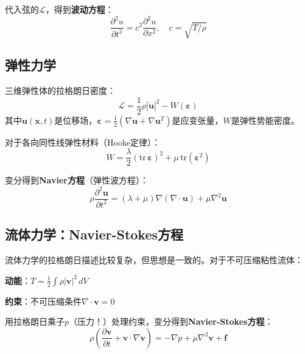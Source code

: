 代入弦的$\mathcal{L}$，得到\textbf{波动方程}：
\begin{equation}
\boxed{\frac{\partial^2 u}{\partial t^2} = c^2 \frac{\partial^2 u}{\partial x^2}, \quad c = \sqrt{T/\rho}}
\end{equation}

\subsection*{弹性力学}

三维弹性体的拉格朗日密度：
\begin{equation}
\mathcal{L} = \frac{1}{2}\rho |\dot{\mathbf{u}}|^2 - W(\boldsymbol{\varepsilon})
\end{equation}
其中$\mathbf{u}(\mathbf{x},t)$是位移场，$\boldsymbol{\varepsilon} = \frac{1}{2}(\nabla \mathbf{u} + \nabla \mathbf{u}^T)$是应变张量，$W$是弹性势能密度。

对于各向同性线弹性材料（Hooke定律）：
\begin{equation}
W = \frac{\lambda}{2}(\text{tr}\,\boldsymbol{\varepsilon})^2 + \mu \, \text{tr}(\boldsymbol{\varepsilon}^2)
\end{equation}

变分得到\textbf{Navier方程}（弹性波方程）：
\begin{equation}
\boxed{\rho \frac{\partial^2 \mathbf{u}}{\partial t^2} = (\lambda + \mu)\nabla(\nabla \cdot \mathbf{u}) + \mu \nabla^2 \mathbf{u}}
\end{equation}


\subsection*{流体力学：Navier-Stokes方程}

流体力学的拉格朗日描述比较复杂，但思想是一致的。对于不可压缩粘性流体：

\textbf{动能}：$T = \frac{1}{2}\int \rho |\mathbf{v}|^2 \, dV$

\textbf{约束}：不可压缩条件$\nabla \cdot \mathbf{v} = 0$

用拉格朗日乘子$p$（压力！）处理约束，变分得到\textbf{Navier-Stokes方程}：
\begin{equation}
\boxed{\rho \left(\frac{\partial \mathbf{v}}{\partial t} + \mathbf{v} \cdot \nabla \mathbf{v}\right) = -\nabla p + \mu \nabla^2 \mathbf{v} + \mathbf{f}}
\end{equation}

